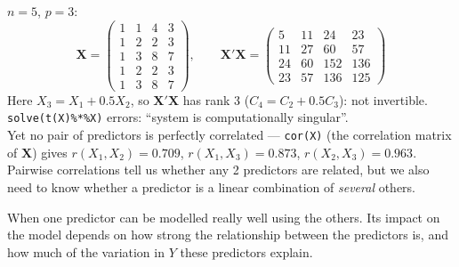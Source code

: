 \begin{example}
    $n=5$, $p=3$:
    \[\mathbf{X}=\begin{pmatrix}1&1&4&3\\1&2&2&3\\1&3&8&7\\1&2&2&3\\1&3&8&7\end{pmatrix},\qquad
    \mathbf{X}'\mathbf{X}=\begin{pmatrix}5&11&24&23\\11&27&60&57\\24&60&152&136\\23&57&136&125\end{pmatrix}\]
    Here $X_3=X_1+0.5X_2$, so $\mathbf{X}'\mathbf{X}$ has rank 3 ($C_4=C_2+0.5C_3$): not
    invertible. \texttt{solve(t(X)\%*\%X)} errors: ``system is computationally singular''.
    \\ Yet no pair of predictors is perfectly correlated --- \texttt{cor(X)} (the correlation matrix
    of $\mathbf{X}$) gives $r(X_1,X_2)=0.709$, $r(X_1,X_3)=0.873$, $r(X_2,X_3)=0.963$. Pairwise
    correlations tell us whether any 2 predictors are related, but we also need to know whether a
    predictor is a linear combination of \emph{several} others.
\end{example}

\begin{definition}[Multicollinearity]
    When one predictor can be modelled really well using the others. Its impact on the model
    depends on how strong the relationship between the predictors is, and how much of the
    variation in $Y$ these predictors explain.
\end{definition}

